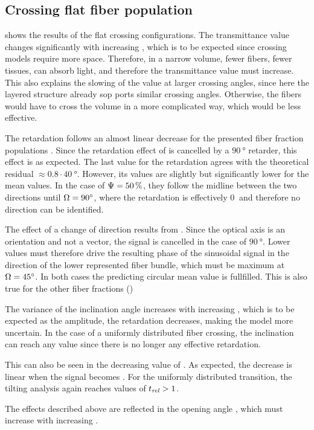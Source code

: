 \subsection{Crossing flat fiber population}
 shows the results of the flat crossing configurations.
The transmittance value changes significantly with increasing \modelOmega{}, which is to be expected since crossing models require more space.
Therefore, in a narrow volume, fewer fibers, \ie{} fewer tissues, can absorb light, and therefore the transmittance value must increase.
This also explains the slowing of the value at larger crossing angles, since here the layered structure already sop ports similar crossing angles.
Otherwise, the fibers would have to cross the volume in a more complicated way, which would be less effective.
\par
%
The retardation follows an almost linear decrease for the presented fiber fraction populations \modelPsi{}.
Since the retardation effect of is cancelled by a $\SI{90}{\degree}$ retarder, this effect is as expected.
The last value for the retardation agrees with the theoretical residual $\approx 0.8\cdot \SI{40}{\degree}$.
However, its values are slightly but significantly lower for the mean \trel{} values.
In the case of $\textnormal{$\Psi$}{} = \SI{50}{\percent}$, they follow the midline between the two directions until $\textnormal{$\Omega$}=\SI{90}{\degree}$, where the retardation is effectively $\SI{0}{}$ and therefore no direction can be identified.
\par
%
The effect of a change of direction results from \dummy{}.
Since the optical axis is an orientation and not a vector, the signal is cancelled in the case of $\SI{90}{\degree}$.
Lower values must therefore drive the resulting phase of the sinusoidal signal in the direction of the lower represented fiber bundle, which must be maximum at $\textnormal{$\Omega$}=\SI{45}{\degree}$.
In both cases the predicting circular mean value is fullfilled.
This is also true for the other fiber fractions ()
\par
%
The variance of the inclination angle increases with increasing \modelOmega{}, which is to be expected as the amplitude, \ie{} the retardation decreases, making the model more uncertain.
In the case of a uniformly distributed fiber crossing, the inclination can reach any value since there is no longer any effective retardation.
\par
%
This can also be seen in the decreasing value of \trel{}.
As expected, the decrease is linear when the signal becomes \dummy{}.
For the uniformly distributed transition, the tilting analysis again reaches values of $\textnormal{$t_\mathit{rel}$}>1$.
\par
%
The effects described above are reflected in the opening angle \openingAngle{}, which must increase with increasing \modelOmega{}.
%
%
%
